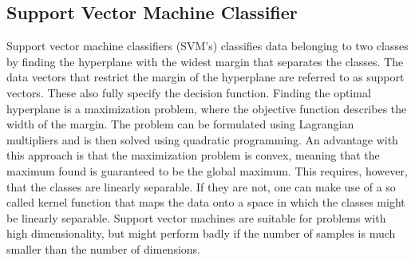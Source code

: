 \subsection{Support Vector Machine Classifier}
Support vector machine classifiers (SVM's) classifies data belonging to two classes by finding the hyperplane with the widest margin that separates the classes. The data vectors that restrict the margin of the hyperplane are referred to as support vectors. These also fully specify the decision function. Finding the optimal hyperplane is a maximization problem, where the objective function describes the width of the margin. The problem can be formulated using Lagrangian multipliers and is then solved using quadratic programming. An advantage with this approach is that the maximization problem is convex, meaning that the maximum found is guaranteed to be the global maximum. This requires, however, that the classes are linearly separable. If they are not, one can make use of a so called kernel function that maps the data onto a space in which the classes might be linearly separable. Support vector machines are suitable for problems with high dimensionality, but might perform badly if the number of samples is much smaller than the number of dimensions.